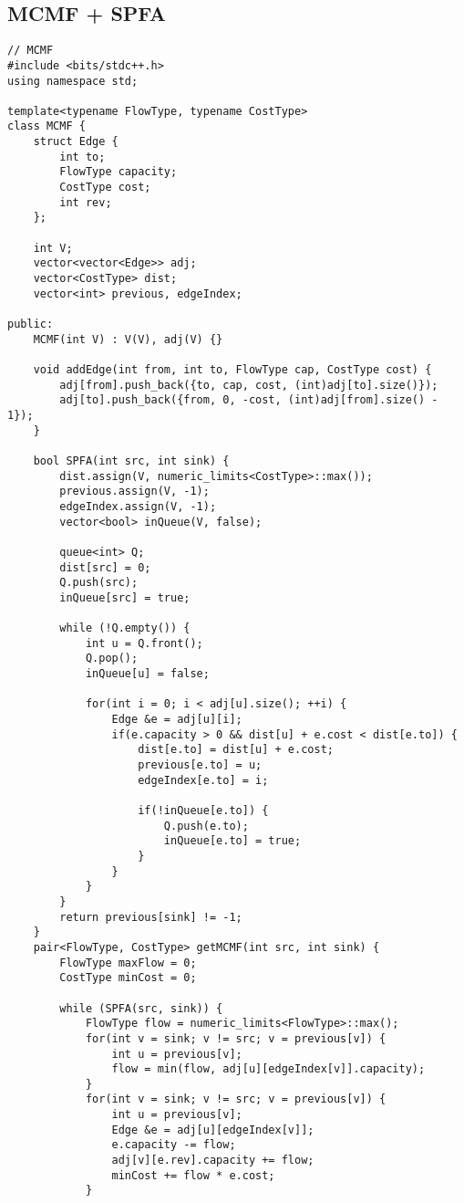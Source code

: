 \documentclass[landscape, 8pt, a4paper, oneside, twocolumn]{extarticle}
\begin{document}
    \subsection{MCMF + SPFA}
    \begin{verbatim}
// MCMF
#include <bits/stdc++.h>
using namespace std;

template<typename FlowType, typename CostType>
class MCMF {
    struct Edge {
        int to;
        FlowType capacity;
        CostType cost;
        int rev;
    };

    int V;
    vector<vector<Edge>> adj;
    vector<CostType> dist;
    vector<int> previous, edgeIndex;

public:
    MCMF(int V) : V(V), adj(V) {}

    void addEdge(int from, int to, FlowType cap, CostType cost) {
        adj[from].push_back({to, cap, cost, (int)adj[to].size()});
        adj[to].push_back({from, 0, -cost, (int)adj[from].size() - 1});
    }

    bool SPFA(int src, int sink) {
        dist.assign(V, numeric_limits<CostType>::max());
        previous.assign(V, -1);
        edgeIndex.assign(V, -1);
        vector<bool> inQueue(V, false);

        queue<int> Q;
        dist[src] = 0;
        Q.push(src);
        inQueue[src] = true;

        while (!Q.empty()) {
            int u = Q.front();
            Q.pop();
            inQueue[u] = false;

            for(int i = 0; i < adj[u].size(); ++i) {
                Edge &e = adj[u][i];
                if(e.capacity > 0 && dist[u] + e.cost < dist[e.to]) {
                    dist[e.to] = dist[u] + e.cost;
                    previous[e.to] = u;
                    edgeIndex[e.to] = i;

                    if(!inQueue[e.to]) {
                        Q.push(e.to);
                        inQueue[e.to] = true;
                    }
                }
            }
        }
        return previous[sink] != -1;
    }
    pair<FlowType, CostType> getMCMF(int src, int sink) {
        FlowType maxFlow = 0;
        CostType minCost = 0;

        while (SPFA(src, sink)) {
            FlowType flow = numeric_limits<FlowType>::max();
            for(int v = sink; v != src; v = previous[v]) {
                int u = previous[v];
                flow = min(flow, adj[u][edgeIndex[v]].capacity);
            }
            for(int v = sink; v != src; v = previous[v]) {
                int u = previous[v];
                Edge &e = adj[u][edgeIndex[v]];
                e.capacity -= flow;
                adj[v][e.rev].capacity += flow;
                minCost += flow * e.cost;
            }


\end{verbatim}
\end{document}
